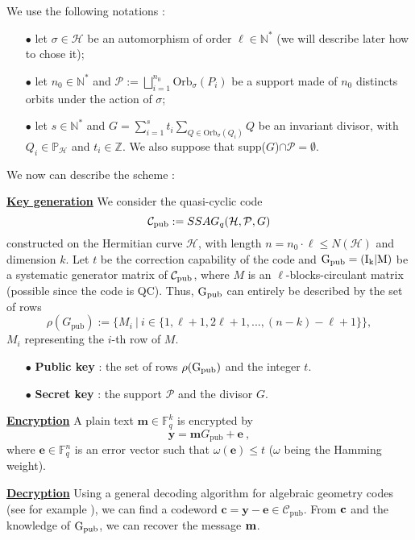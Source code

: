 \documentclass[10pt]{article}
\newcommand{\s}{\vspace{0.3cm}}
\newcommand{\cd}{\cdot}
\newcommand{\N}{\mathbb{N}}
\newcommand{\Z}{\mathbb{Z}}
\newcommand{\PP}{\mathbb{P}}
\newcommand{\fq}{\mathbb{F}_q}
\newcommand{\w}{\omega}
\newcommand{\PR}{\mathcal{P}}
\begin{document}
\s

We use the following notations : 
\begin{enumerate}
\item[$\bullet$] let $\sigma \in \mathcal{H}$ be an automorphism of order $\ell \in \N^*$ (we will describe later how to chose it);
\item[$\bullet$] let $n_0 \in \N^* $ and $\PR := \bigsqcup\limits_{i=1}^{n_0} \mathrm{Orb}_{\sigma}(P_i)$ be a support made of $n_0$ distincts orbits under the action of $\sigma$;
\item[$\bullet$] let $s \in \N^*$ and $G = \sum\limits_{i=1}^s t_i \sum\limits_{Q \in \mathrm{Orb}_{\sigma}(Q_i)} Q$ be an invariant divisor, with $Q_i \in \PP_{\mathcal{H}}$ and $t_i \in \Z$. We also suppose that supp($G$)$\cap \PR = \emptyset$.
\end{enumerate}

We now can describe the scheme :

\s 

\underline{\bf{Key generation}} We consider the quasi-cyclic code 
\[\mathcal{C}_{\rm pub} := SSAG_q(\mathcal{H},\PR,G)\]
constructed on the Hermitian curve $\mathcal{H}$, with length $n=n_0 \cd \ell\leq N(\mathcal{H})$ and dimension $k$. Let $t$ be the correction capability of the code and $\rm G_{pub} = (I_k | M)$ be a systematic generator matrix of $\mathcal{C}_{\rm pub}$, where $M$ is an $\ell$-blocks-circulant matrix (possible since the code is QC). Thus, $\rm G_{pub}$ can entirely be described by the set of rows
\[\rho(G_{\mathrm{pub}}) := \{M_i \ | \ i \in \{1,\ell+1,2\ell+1,...,(n-k)-\ell+1\}\},\]
$M_i$ representing the $i$-th row of $M$. 

\begin{enumerate}
\item[$\bullet$] \textbf{Public key} :  the set of rows $\rho(\rm G_{pub})$ and the integer $t$.
\item[$\bullet$] \textbf{Secret key} :  the support $\PR$ and the divisor $G$.
\end{enumerate}

\s

\underline{\bf{Encryption}} A plain text $\mathbf{m} \in \fq^k$ is encrypted by 
\[ \mathbf{y}  = \mathbf{m}G_{\mathrm{pub}} + \mathbf{e} \ ,\]
where $\mathbf{e} \in \fq^n$ is an error vector such that $\w(\mathbf{e}) \leq t$ ($\w$ being the Hamming weight).

\s

\underline{\bf{Decryption}} Using a general decoding algorithm for algebraic geometry codes (see for example \cite{THRP}), we can find a codeword $\mathbf{c} = \mathbf{y - e} \in \mathcal{C}_{\mathrm{pub}}$. From $\bf{c}$ and the knowledge of $\rm G_{pub}$, we can recover the message $\bf{m}$.
\end{document}
